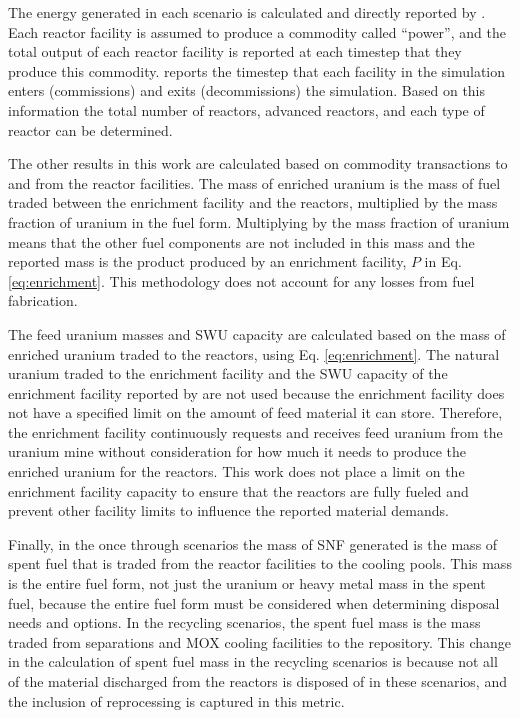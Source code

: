 The energy generated in each scenario is calculated and directly 
reported by \Cyclus. Each reactor facility is assumed to produce a 
commodity called ``power'', and the total output of each reactor facility 
is reported at each timestep that they produce this commodity. 
\Cyclus reports the timestep that each facility in the simulation enters 
(commissions) and exits (decommissions) the simulation. Based on 
this information the total number of reactors, advanced reactors, and 
each type of reactor can be determined. 

The other results in this work are calculated based on commodity 
transactions to and from the reactor facilities. The mass of enriched 
uranium is the mass of fuel traded between the enrichment facility and 
the reactors, multiplied by the mass fraction of uranium in the fuel 
form. Multiplying by the mass fraction of uranium means that the other 
fuel components are not included in this mass and the reported mass is 
the product produced by an enrichment facility, $P$ in Eq. 
\ref{eq:enrichment}. This methodology does not account for any 
losses from fuel fabrication.

The feed uranium masses and \gls{SWU} capacity are calculated 
based on the mass of enriched uranium traded to the reactors, using 
Eq. \ref{eq:enrichment}. The natural uranium traded to the enrichment 
facility and the \gls{SWU} capacity of the enrichment facility reported 
by 
\Cyclus are not used because the enrichment facility does not have a 
specified limit on the amount of feed material it can store. Therefore, 
the enrichment facility continuously requests and receives feed 
uranium from the uranium mine without consideration for how much it needs 
to produce the enriched uranium for the reactors. This work does not 
place a limit on the enrichment facility capacity to ensure that the 
reactors are fully fueled and prevent other facility limits to 
influence the reported material demands. 

Finally, in the once through scenarios the mass of \gls{SNF} generated is 
the mass of spent fuel that is 
traded from the reactor facilities to the cooling pools. This mass is the 
entire fuel form, not just the uranium or heavy metal mass in the spent 
fuel, because the entire fuel form must be considered when determining 
disposal needs and options. In the recycling scenarios, the spent fuel 
mass is the mass traded from separations and \gls{MOX} cooling facilities 
to the repository. This change in the calculation of spent fuel mass 
in the recycling scenarios is because not all of the material discharged 
from the reactors is disposed of in these scenarios, and the inclusion of 
reprocessing is captured in this metric. 
